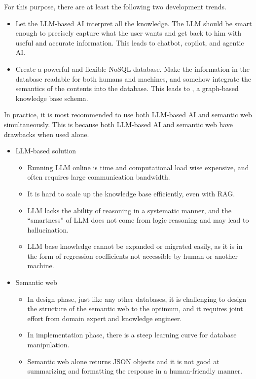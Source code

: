 For this purpose, there are at least the following two development trends.
\begin{itemize}
  \item Let the LLM-based AI interpret all the knowledge. The LLM should be smart enough to precisely capture what the user wants and get back to him with useful and accurate information. This leads to chatbot, copilot,  and agentic AI.
  \item Create a powerful and flexible NoSQL database. Make the information in the database readable for both humans and machines, and somehow integrate the semantics of the contents into the database. This leads to , a graph-based knowledge base schema.
\end{itemize}

In practice, it is most recommended to use both LLM-based AI and semantic web simultaneously. This is because both LLM-based AI and semantic web have drawbacks when used alone.
\begin{itemize}
	\item LLM-based solution
	\begin{itemize}
		\item Running LLM online is time and computational load wise expensive, and often requires large communication bandwidth. 
		\item It is hard to scale up the knowledge base efficiently, even with RAG.
		\item LLM lacks the ability of reasoning in a systematic manner, and the ``smartness'' of LLM does not come from logic reasoning and may lead to hallucination.
		\item LLM base knowledge cannot be expanded or migrated easily, as it is in the form of regression coefficients not accessible by human or another machine.
	\end{itemize}
	
	\item Semantic web
	\begin{itemize}
		\item In design phase, just like any other databases, it is challenging to design the structure of the semantic web to the optimum, and it requires joint effort from domain expert and knowledge engineer.
		\item In implementation phase, there is a steep learning curve for database manipulation.
		\item Semantic web alone returns JSON objects and it is not good at summarizing and formatting the response in a human-friendly manner.
	\end{itemize}
\end{itemize}

